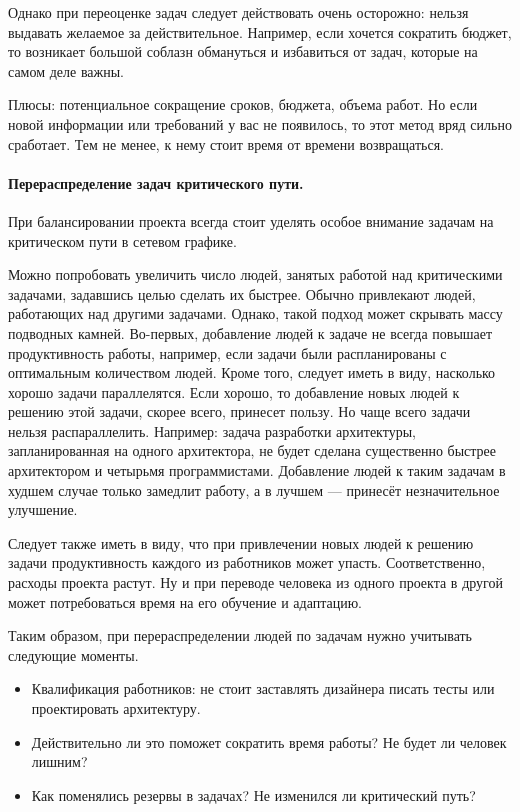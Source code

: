 \documentclass{../../text-style}
\begin{document}
Однако при переоценке задач следует действовать очень осторожно: нельзя выдавать желаемое за действительное. Например, если хочется сократить бюджет, то возникает большой соблазн обмануться и избавиться от задач, которые на самом деле важны.

Плюсы: потенциальное сокращение сроков, бюджета, объема работ. Но если новой информации или требований у вас не появилось, то этот метод вряд сильно сработает. Тем не менее, к нему стоит время от времени возвращаться.

\paragraph{Перераспределение задач критического пути.} При балансировании проекта всегда стоит уделять особое внимание задачам на критическом пути в сетевом графике.

Можно попробовать увеличить число людей, занятых работой над критическими задачами, задавшись целью сделать их быстрее. Обычно привлекают людей, работающих над другими задачами. Однако, такой подход может скрывать массу подводных камней. Во-первых, добавление людей к задаче не всегда повышает продуктивность работы, например, если задачи были распланированы с оптимальным количеством людей. Кроме того, следует иметь в виду, насколько хорошо задачи параллелятся. Если хорошо, то добавление новых людей к решению этой задачи, скорее всего, принесет пользу. Но чаще всего задачи нельзя распараллелить. Например: задача разработки архитектуры, запланированная на одного архитектора, не будет сделана существенно быстрее архитектором и четырьмя программистами. Добавление людей к таким задачам в худшем случае только замедлит работу, а в лучшем --- принесёт незначительное улучшение.

Следует также иметь в виду, что при привлечении новых людей к решению задачи продуктивность каждого из работников может упасть. Соответственно, расходы проекта растут. Ну и при переводе человека из одного проекта в другой может потребоваться время на его обучение и адаптацию.

Таким образом, при перераспределении людей по задачам нужно учитывать следующие моменты.

\begin{itemize}
    \item Квалификация работников: не стоит заставлять дизайнера писать тесты или проектировать архитектуру.
    \item Действительно ли это поможет сократить время работы? Не будет ли человек лишним? 
    \item Как поменялись резервы в задачах? Не изменился ли критический путь?
\end{itemize}
\end{document}
